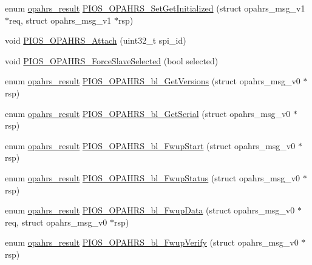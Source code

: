 \begin{DoxyCompactItemize}
\item 
enum \hyperlink{group___p_i_o_s___o_p_a_h_r_s_gaf6fe64d28ea92983e870494d0a5d05bd}{opahrs\-\_\-result} \hyperlink{group___p_i_o_s___o_p_a_h_r_s_ga1c2a499e2354e0673f66656bcb4def7a}{\-P\-I\-O\-S\-\_\-\-O\-P\-A\-H\-R\-S\-\_\-\-Set\-Get\-Initialized} (struct opahrs\-\_\-msg\-\_\-v1 $\ast$req, struct opahrs\-\_\-msg\-\_\-v1 $\ast$rsp)
\item 
void \hyperlink{group___p_i_o_s___o_p_a_h_r_s_ga3c5db99dda75d50cdb2d79fdb13ab50a}{\-P\-I\-O\-S\-\_\-\-O\-P\-A\-H\-R\-S\-\_\-\-Attach} (uint32\-\_\-t spi\-\_\-id)
\item 
void \hyperlink{group___p_i_o_s___o_p_a_h_r_s_ga2ce9aa363884ac4a0e00d1b984779379}{\-P\-I\-O\-S\-\_\-\-O\-P\-A\-H\-R\-S\-\_\-\-Force\-Slave\-Selected} (bool selected)
\item 
enum \hyperlink{group___p_i_o_s___o_p_a_h_r_s_gaf6fe64d28ea92983e870494d0a5d05bd}{opahrs\-\_\-result} \hyperlink{group___p_i_o_s___o_p_a_h_r_s_gab77141d03bc5b17886bec2bb4fcec3a7}{\-P\-I\-O\-S\-\_\-\-O\-P\-A\-H\-R\-S\-\_\-bl\-\_\-\-Get\-Versions} (struct opahrs\-\_\-msg\-\_\-v0 $\ast$rsp)
\item 
enum \hyperlink{group___p_i_o_s___o_p_a_h_r_s_gaf6fe64d28ea92983e870494d0a5d05bd}{opahrs\-\_\-result} \hyperlink{group___p_i_o_s___o_p_a_h_r_s_ga43649afa78f6c8bacb299cbd8c7b000f}{\-P\-I\-O\-S\-\_\-\-O\-P\-A\-H\-R\-S\-\_\-bl\-\_\-\-Get\-Serial} (struct opahrs\-\_\-msg\-\_\-v0 $\ast$rsp)
\item 
enum \hyperlink{group___p_i_o_s___o_p_a_h_r_s_gaf6fe64d28ea92983e870494d0a5d05bd}{opahrs\-\_\-result} \hyperlink{group___p_i_o_s___o_p_a_h_r_s_gabf88838c097eb514d070f373c2dcd063}{\-P\-I\-O\-S\-\_\-\-O\-P\-A\-H\-R\-S\-\_\-bl\-\_\-\-Fwup\-Start} (struct opahrs\-\_\-msg\-\_\-v0 $\ast$rsp)
\item 
enum \hyperlink{group___p_i_o_s___o_p_a_h_r_s_gaf6fe64d28ea92983e870494d0a5d05bd}{opahrs\-\_\-result} \hyperlink{group___p_i_o_s___o_p_a_h_r_s_gaa87845021b5151fe9462ea3bc6c3b826}{\-P\-I\-O\-S\-\_\-\-O\-P\-A\-H\-R\-S\-\_\-bl\-\_\-\-Fwup\-Status} (struct opahrs\-\_\-msg\-\_\-v0 $\ast$rsp)
\item 
enum \hyperlink{group___p_i_o_s___o_p_a_h_r_s_gaf6fe64d28ea92983e870494d0a5d05bd}{opahrs\-\_\-result} \hyperlink{group___p_i_o_s___o_p_a_h_r_s_ga658babb3f11ce146f013c2de54adc4be}{\-P\-I\-O\-S\-\_\-\-O\-P\-A\-H\-R\-S\-\_\-bl\-\_\-\-Fwup\-Data} (struct opahrs\-\_\-msg\-\_\-v0 $\ast$req, struct opahrs\-\_\-msg\-\_\-v0 $\ast$rsp)
\item 
enum \hyperlink{group___p_i_o_s___o_p_a_h_r_s_gaf6fe64d28ea92983e870494d0a5d05bd}{opahrs\-\_\-result} \hyperlink{group___p_i_o_s___o_p_a_h_r_s_ga4bb7842e9f92a0286d39da199a3d5247}{\-P\-I\-O\-S\-\_\-\-O\-P\-A\-H\-R\-S\-\_\-bl\-\_\-\-Fwup\-Verify} (struct opahrs\-\_\-msg\-\_\-v0 $\ast$rsp)

\end{DoxyCompactItemize}
